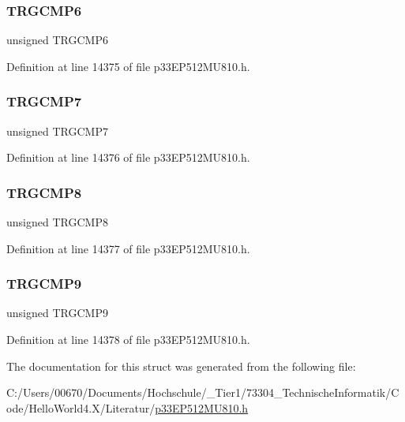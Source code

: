 \subsubsection{\texorpdfstring{T\+R\+G\+C\+M\+P6}{TRGCMP6}}
{\footnotesize\ttfamily unsigned T\+R\+G\+C\+M\+P6}



Definition at line 14375 of file p33\+E\+P512\+M\+U810.\+h.

\mbox{\label{structtag_t_r_i_g2_b_i_t_s_aa801131b5ab0b542a360d202275ea4fd}} 
\subsubsection{\texorpdfstring{T\+R\+G\+C\+M\+P7}{TRGCMP7}}
{\footnotesize\ttfamily unsigned T\+R\+G\+C\+M\+P7}



Definition at line 14376 of file p33\+E\+P512\+M\+U810.\+h.

\mbox{\label{structtag_t_r_i_g2_b_i_t_s_a7d4f3ec40334f00592eb7247457e2fd6}} 
\subsubsection{\texorpdfstring{T\+R\+G\+C\+M\+P8}{TRGCMP8}}
{\footnotesize\ttfamily unsigned T\+R\+G\+C\+M\+P8}



Definition at line 14377 of file p33\+E\+P512\+M\+U810.\+h.

\mbox{\label{structtag_t_r_i_g2_b_i_t_s_a0001e7efb9031bef24e7a19100d11b0b}} 
\subsubsection{\texorpdfstring{T\+R\+G\+C\+M\+P9}{TRGCMP9}}
{\footnotesize\ttfamily unsigned T\+R\+G\+C\+M\+P9}



Definition at line 14378 of file p33\+E\+P512\+M\+U810.\+h.



The documentation for this struct was generated from the following file\+:\begin{DoxyCompactItemize}
\item 
C\+:/\+Users/00670/\+Documents/\+Hochschule/\+\_\+\+Tier1/73304\+\_\+\+Technische\+Informatik/\+Code/\+Hello\+World4.\+X/\+Literatur/\hyperlink{p33_e_p512_m_u810_8h}{p33\+E\+P512\+M\+U810.\+h}\end{DoxyCompactItemize}

